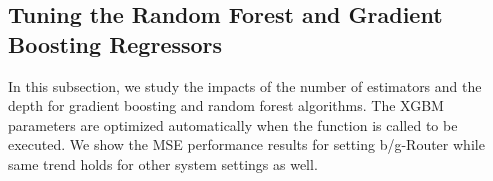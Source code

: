 
\subsection{Tuning the Random Forest and Gradient Boosting Regressors}

In this subsection, we study the impacts of the number of estimators and the depth for gradient boosting and random forest algorithms. The XGBM parameters are optimized automatically when the function is called to be executed. We show the MSE performance results for setting b/g-Router while same trend holds for other system settings as well. 


